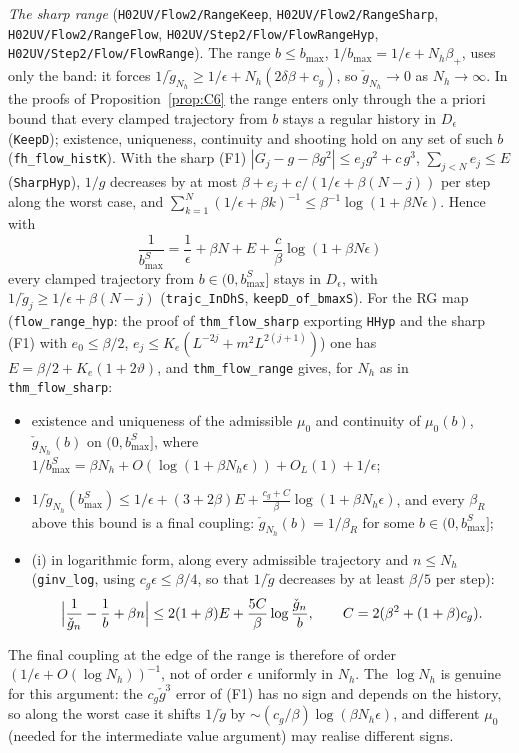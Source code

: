 \documentclass[11pt]{amsart}
\theoremstyle{definition}
\theoremstyle{remark}
\numberwithin{equation}{section}
\begin{document}
\begin{itemize}
\emph{The sharp range} (\texttt{H02UV/Flow2/RangeKeep}, \texttt{H02UV/Flow2/RangeSharp}, \texttt{H02UV/Flow2/RangeFlow},
\texttt{H02UV/Step2/Flow/FlowRangeHyp}, \texttt{H02UV/Step2/Flow/FlowRange}). The range $b\le b_{\max}$,
$1/b_{\max}=1/\epsilon+N_h\beta_+$, uses only the band: it forces $1/\check g_{N_h}\ge1/\epsilon+N_h(2\delta\beta+c_g)$, so
$\check g_{N_h}\to0$ as $N_h\to\infty$. In the proofs of Proposition~\ref{prop:C6} the range enters only through the a priori
bound that every clamped trajectory from $b$ stays a regular history in $D_\epsilon$ (\texttt{KeepD}); existence,
uniqueness, continuity and shooting hold on any set of such $b$ (\texttt{fh\_flow\_histK}). With the sharp (F1)
$|G_j-g-\beta g^2|\le e_jg^2+c\,g^3$, $\sum_{j<N}e_j\le E$ (\texttt{SharpHyp}), $1/g$ decreases by at most
$\beta+e_j+c/(1/\epsilon+\beta(N-j))$ per step along the worst case, and
$\sum_{k=1}^N(1/\epsilon+\beta k)^{-1}\le\beta^{-1}\log(1+\beta N\epsilon)$. Hence with
\[
  \frac1{b_{\max}^S}=\frac1\epsilon+\beta N+E+\frac c\beta\log(1+\beta N\epsilon)
\]
every clamped trajectory from $b\in(0,b^S_{\max}]$ stays in $D_\epsilon$, with $1/\check g_j\ge1/\epsilon+\beta(N-j)$
(\texttt{trajc\_InDhS}, \texttt{keepD\_of\_bmaxS}). For the RG map (\texttt{flow\_range\_hyp}: the proof of
\texttt{thm\_flow\_sharp} exporting \texttt{HHyp} and the sharp (F1) with $e_0\le\beta/2$,
$e_j\le K_e(L^{-2j}+m^2L^{2(j+1)})$) one has $E=\beta/2+K_e(1+2\vartheta)$, and \texttt{thm\_flow\_range} gives, for
$N_h$ as in \texttt{thm\_flow\_sharp}:
\begin{itemize}
\item existence and uniqueness of the admissible $\mu_0$ and continuity of $\mu_0(b)$, $\check g_{N_h}(b)$ on
  $(0,b^S_{\max}]$, where $1/b^S_{\max}=\beta N_h+O(\log(1+\beta N_h\epsilon))+O_L(1)+1/\epsilon$;
\item $1/\check g_{N_h}(b^S_{\max})\le1/\epsilon+(3+2\beta)E+\frac{c_g+C}{\beta}\log(1+\beta N_h\epsilon)$, and every
  $\beta_R$ above this bound is a final coupling: $\check g_{N_h}(b)=1/\beta_R$ for some $b\in(0,b^S_{\max}]$;
\item (i) in logarithmic form, along every admissible trajectory and $n\le N_h$ (\texttt{ginv\_log}, using
  $c_g\epsilon\le\beta/4$, so that $1/\check g$ decreases by at least $\beta/5$ per step):
  \[
    \Bigl|\frac1{\check g_n}-\frac1b+\beta n\Bigr|\le2(1+\beta)E+\frac{5C}{\beta}\log\frac{\check g_n}{b},
    \qquad C=2(\beta^2+(1+\beta)c_g).
  \]
\end{itemize}
The final coupling at the edge of the range is therefore of order $(1/\epsilon+O(\log N_h))^{-1}$, not of
order $\epsilon$ uniformly in $N_h$. The $\log N_h$ is genuine for this argument: the $c_g\check g^3$ error of
(F1) has no sign and depends on the history, so along the worst case it shifts $1/\check g$ by
$\sim(c_g/\beta)\log(\beta N_h\epsilon)$, and different $\mu_0$ (needed for the intermediate value argument)
may realise different signs.


\end{itemize}
\end{document}
